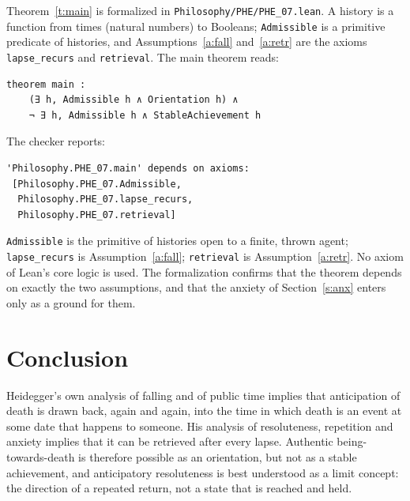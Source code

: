 \documentclass{situationist-preprint}
\begin{document}
Theorem~\ref{t:main} is formalized in \nolinkurl{Philosophy/PHE/PHE_07.lean}. A history is a function from times (natural numbers) to Booleans; \texttt{Admissible} is a primitive predicate of histories, and Assumptions~\ref{a:fall} and~\ref{a:retr} are the axioms \texttt{lapse\_recurs} and \texttt{retrieval}. The main theorem reads:

\begin{lstlisting}
theorem main :
    (∃ h, Admissible h ∧ Orientation h) ∧
    ¬ ∃ h, Admissible h ∧ StableAchievement h
\end{lstlisting}

The checker reports:

\begin{lstlisting}
'Philosophy.PHE_07.main' depends on axioms:
 [Philosophy.PHE_07.Admissible,
  Philosophy.PHE_07.lapse_recurs,
  Philosophy.PHE_07.retrieval]
\end{lstlisting}

\texttt{Admissible} is the primitive of histories open to a finite, thrown agent; \texttt{lapse\_recurs} is Assumption~\ref{a:fall}; \texttt{retrieval} is Assumption~\ref{a:retr}. No axiom of Lean's core logic is used. The formalization confirms that the theorem depends on exactly the two assumptions, and that the anxiety of Section~\ref{s:anx} enters only as a ground for them.

\section{Conclusion}

Heidegger's own analysis of falling and of public time implies that anticipation of death is drawn back, again and again, into the time in which death is an event at some date that happens to someone. His analysis of resoluteness, repetition and anxiety implies that it can be retrieved after every lapse. Authentic being-towards-death is therefore possible as an orientation, but not as a stable achievement, and anticipatory resoluteness is best understood as a limit concept: the direction of a repeated return, not a state that is reached and held.
\end{document}
